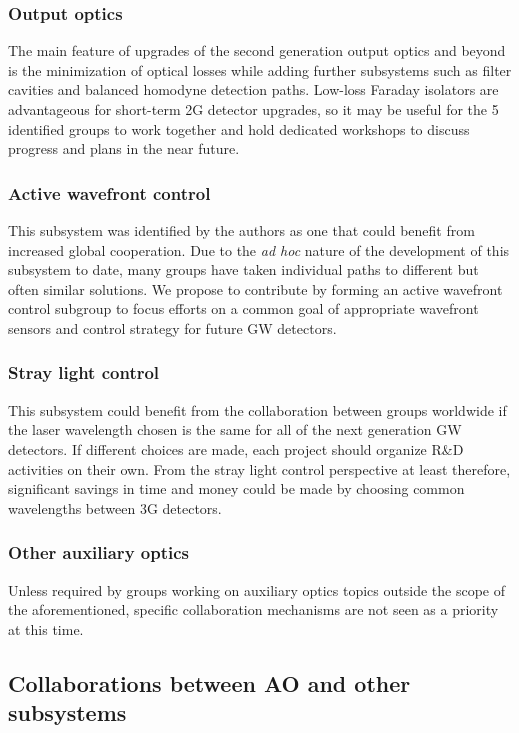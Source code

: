 \subsubsection{\bf Output optics} The main feature of upgrades of the second generation output optics and beyond is the minimization of optical losses while adding further subsystems such as filter cavities and balanced homodyne detection paths. 
Low-loss Faraday isolators are advantageous for short-term 2G detector upgrades, so it may be useful for the 5 identified groups to work together and hold dedicated workshops to discuss progress and plans in the near future. 
\subsubsection{\bf Active wavefront control} 
This subsystem was identified by the authors as one that could benefit from increased global cooperation. Due to the \emph{ad hoc} nature of the development of this subsystem to date, many groups have taken individual paths to different but often similar solutions. We propose to contribute by forming an active wavefront control subgroup to focus efforts on a common goal of appropriate wavefront sensors and control strategy for future GW detectors. 

\subsubsection{\bf Stray light control} This subsystem could benefit from the collaboration between groups worldwide if the laser wavelength chosen is the same for all of the next generation GW detectors. If different choices are made, each project should organize R\&D activities on their own. From the stray light control perspective at least therefore, significant savings in time and money could be made by choosing common wavelengths between 3G detectors. 

\subsubsection{\bf Other auxiliary optics} Unless required by groups working on auxiliary optics topics outside the scope of the aforementioned, specific collaboration mechanisms are not seen as a priority at this time. 


\subsection{Collaborations between AO and other subsystems}


